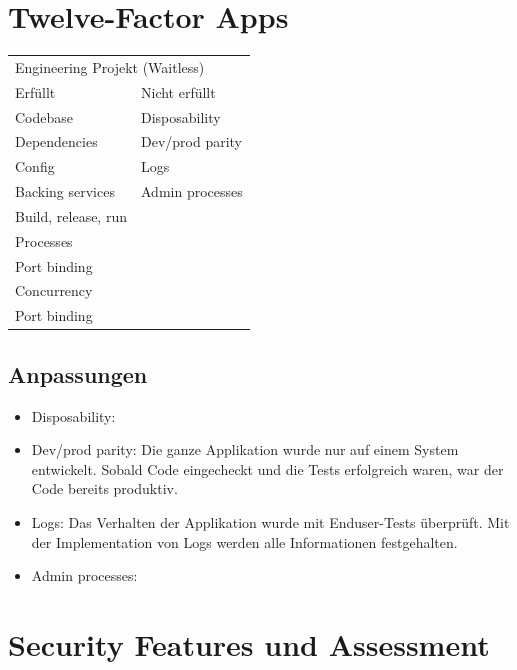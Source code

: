 \documentclass[12pt,a4paper]{article}
\begin{document}
\section{Twelve-Factor Apps}
    \begin{table}[h]
        \begin{tabular}{ll}
        \multicolumn{2}{l}{Engineering Projekt (Waitless)} \\
        Erfüllt               & Nicht erfüllt              \\
        Codebase              & Disposability              \\
        Dependencies          & Dev/prod parity            \\
        Config                & Logs                       \\
        Backing services      & Admin processes            \\
        Build, release, run   &                            \\
        Processes             &                            \\
        Port binding          &                            \\
        Concurrency           &                            \\
        Port binding          &                            \\
        \end{tabular}
    \end{table}

\subsection{Anpassungen}
    \begin{itemize}
        \item Disposability:
        \item Dev/prod parity: Die ganze Applikation wurde nur auf einem System entwickelt. Sobald Code eingecheckt und die Tests
              erfolgreich waren, war der Code bereits produktiv.
        \item Logs: Das Verhalten der Applikation wurde mit Enduser-Tests überprüft. Mit der Implementation von Logs werden alle
              Informationen festgehalten.
        \item Admin processes:
    \end{itemize}

\section{Security Features und Assessment}
\end{document}
